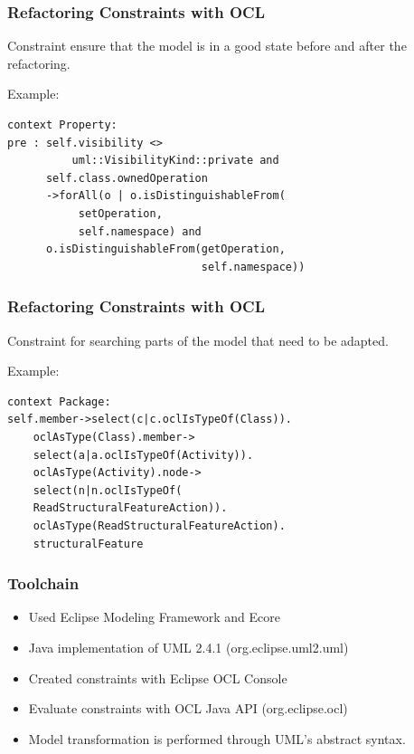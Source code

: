 \documentclass{beamer}
\begin{document}
        
\begin{frame}[fragile]
\frametitle{Refactoring Constraints with OCL}
Constraint ensure that the model is in a good state
before and after the refactoring.

Example:
\begin{lstlisting}[morekeywords={self,forAll,uml,VisibilityKind,o}]
context Property:
pre : self.visibility <> 
          uml::VisibilityKind::private and 
      self.class.ownedOperation
      ->forAll(o | o.isDistinguishableFrom(
           setOperation, 
           self.namespace) and
      o.isDistinguishableFrom(getOperation,
                              self.namespace))
\end{lstlisting}

\end{frame}

\begin{frame}[fragile]
\frametitle{Refactoring Constraints with OCL}
Constraint for searching parts of the model that need to be adapted.

Example:
\begin{lstlisting}[morekeywords={self,forAll,uml,VisibilityKind,o,oclAsType,oclIsTypeOf}]
context Package:
self.member->select(c|c.oclIsTypeOf(Class)).
    oclAsType(Class).member->
    select(a|a.oclIsTypeOf(Activity)).
    oclAsType(Activity).node->
    select(n|n.oclIsTypeOf(
    ReadStructuralFeatureAction)).
    oclAsType(ReadStructuralFeatureAction).
    structuralFeature
\end{lstlisting}

\end{frame}

\begin{frame}
\frametitle{Toolchain}
\begin{itemize}
 \item Used Eclipse Modeling Framework and Ecore
 \item Java implementation of UML 2.4.1 (org.eclipse.uml2.uml)
 \item Created constraints with Eclipse OCL Console
 \item Evaluate constraints with OCL Java API (org.eclipse.ocl)
 \item Model transformation is performed through UML's abstract syntax.
\end{itemize}
\end{frame}
\end{document}
